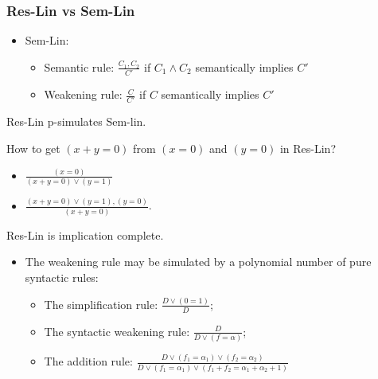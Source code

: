 \begin{frame}
    \frametitle{Res-Lin vs Sem-Lin}

    \begin{itemize}
		\item Sem-Lin:
			\begin{itemize}
				\item Semantic rule: $\frac{C_1, C_2}{C'}$ if $C_1 \land C_2$
		            semantically implies $C'$
				\item Weakening rule: $\frac{C}{C'}$ if $C$ semantically implies $C'$
			\end{itemize}
	\end{itemize}

	\pause
    \begin{theorem}
        Res-Lin p-simulates Sem-lin.
    \end{theorem}

	\pause
    \begin{block}
        How to get $(x + y = 0)$ from $(x = 0)$ and $(y = 0)$ in Res-Lin?
    \end{block}
    
	\begin{itemize}
		\item $\frac{(x = 0)}{(x + y = 0) \lor (y = 1)}$
		\item $\frac{(x + y = 0) \lor (y = 1),(y = 0)}{(x + y = 0)}$.
	\end{itemize}

	\pause
    \begin{theorem}
        Res-Lin is implication complete.
    \end{theorem}

	\begin{itemize}
        \pause
		\item The weakening rule may be simulated by a polynomial number of pure
	        syntactic rules:
		\begin{itemize}
			\item The simplification rule: $\frac{D \lor (0 = 1)}{D}$; 
			\item The syntactic weakening rule: $\frac{D}{D \lor (f = \alpha)}$;
			\item The addition rule: $\frac{D \lor (f_1 = \alpha_1) \lor
		        (f_2 = \alpha_2)}{D \lor (f_1 = \alpha_1) \lor
                (f_1 + f_2 = \alpha_1 + \alpha_2 + 1)}$ 
		\end{itemize}
	\end{itemize}
\end{frame}



